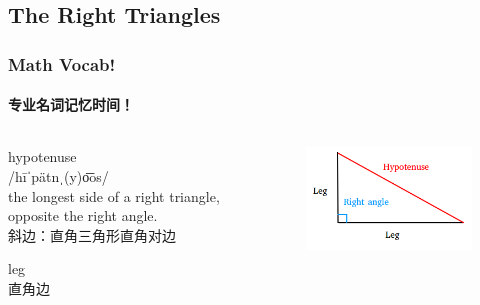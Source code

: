 \documentclass[
	11pt, %
	handout,
]{beamer}
\begin{document}

\subsection{The Right Triangles}


\begin{frame}
	\frametitle{Math Vocab!} %
	\framesubtitle{专业名词记忆时间！}
	
	\begin{columns}[t] 
		\begin{column}{0.7\textwidth} %
			{\Huge hypotenuse}\\
	{\LARGE /hīˈpätnˌ(y)o͞os/\\
		\bigskip\bigskip
	the longest side of a right triangle, opposite the right angle. \\ 
	斜边：直角三角形直角对边}
	\bigskip\bigskip\bigskip\bigskip

		{\Huge leg}\\{\LARGE 直角边}
		\end{column}
		\begin{column}{0.3\textwidth} %
					\begin{figure}
				\includegraphics[width=\linewidth]{Hypotenuse.png}
			\end{figure}	
		\end{column}
	\end{columns}
\end{frame}

\end{document}
